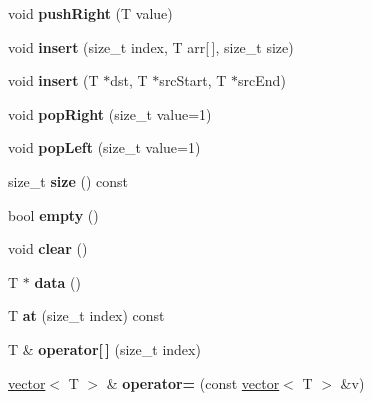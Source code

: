 \begin{DoxyCompactItemize}
void {\bfseries push\+Right} (T value)
\item 
\mbox{\label{classyanujz_1_1vector_a10bc16f91c1d549cfb2105e4ca9f4f39}} 
void {\bfseries insert} (size\+\_\+t index, T arr\mbox{[}$\,$\mbox{]}, size\+\_\+t size)
\item 
\mbox{\label{classyanujz_1_1vector_a842a2fee1debbcbfc93acfe2603789f6}} 
void {\bfseries insert} (T $\ast$dst, T $\ast$src\+Start, T $\ast$src\+End)
\item 
\mbox{\label{classyanujz_1_1vector_a2575a44b1ec73b0e9d733b25cc88d373}} 
void {\bfseries pop\+Right} (size\+\_\+t value=1)
\item 
\mbox{\label{classyanujz_1_1vector_a475cb1209615caeff951aaeb3054a9d9}} 
void {\bfseries pop\+Left} (size\+\_\+t value=1)
\item 
\mbox{\label{classyanujz_1_1vector_acadcada884c64b846e3e56920c4dbce8}} 
size\+\_\+t {\bfseries size} () const
\item 
\mbox{\label{classyanujz_1_1vector_a972426cdc2a35b7f8eb13ad8fa39b2ce}} 
bool {\bfseries empty} ()
\item 
\mbox{\label{classyanujz_1_1vector_af00bcbaec1205084ee5c62e49d7830c9}} 
void {\bfseries clear} ()
\item 
\mbox{\label{classyanujz_1_1vector_aaf13006bde6bbf9e048c0d686651c799}} 
T $\ast$ {\bfseries data} ()
\item 
\mbox{\label{classyanujz_1_1vector_a4d96fe343042e6c536848ddd929b5bae}} 
T {\bfseries at} (size\+\_\+t index) const
\item 
\mbox{\label{classyanujz_1_1vector_a57bd3e4c1ce3f46a299d72ae3b72a21c}} 
T \& {\bfseries operator\mbox{[}$\,$\mbox{]}} (size\+\_\+t index)
\item 
\mbox{\label{classyanujz_1_1vector_afb06d63c6b009adc19b3feffebe1a9f8}} 
\mbox{\hyperlink{classyanujz_1_1vector}{vector}}$<$ T $>$ \& {\bfseries operator=} (const \mbox{\hyperlink{classyanujz_1_1vector}{vector}}$<$ T $>$ \&v)

\end{DoxyCompactItemize}
